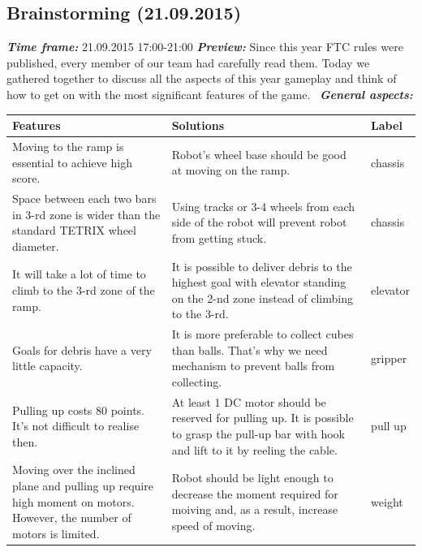 \subsection{Brainstorming (21.09.2015)}
	\textit{\textbf{Time frame:}} 21.09.2015 17:00-21:00 \newline
	\textit{\textbf{Preview:}} Since this year FTC rules were published, every member of our team had carefully read them. Today we gathered together to discuss all the aspects of this year gameplay and think of how to get on with the most significant features of the game. \newline \newline
	\textit{\textbf{General aspects:}}
	\begin{table}[H]
		\vspace{-2mm}
		\begin{center}
			\begin{tabular}{|p{0.4\linewidth}|p{0.5\linewidth}|p{0.1\linewidth}|}
				\hline
				Features & Solutions & Label \\
				\hline
				Moving to the ramp is essential to achieve high score. & Robot's wheel base should be good at moving on the ramp. & chassis \\
				\hline
				Space between each two bars in 3-rd zone is wider than the standard TETRIX wheel diameter. & Using tracks or 3-4 wheels from each side of the robot will prevent robot from getting stuck. & chassis \\
				\hline
				It will take a lot of time to climb to the 3-rd zone of the ramp. & It is possible to deliver debris to the highest goal with elevator standing on the 2-nd zone instead of climbing to the 3-rd. & elevator \\
				\hline
				Goals for debris have a very little capacity. & It is more preferable to collect cubes than balls. That's why we need mechanism to prevent balls from collecting. & gripper \\
				\hline
				Pulling up costs 80 points. It's not difficult to realise then. & At least 1 DC motor should be reserved for pulling up. It is possible to grasp the pull-up bar with hook and lift to it by reeling the cable. & pull up \\
				\hline
				Moving over the inclined plane and pulling up require high moment on motors. However, the number of motors is limited. & Robot should be light enough to decrease the moment required for moiving and, as a result, increase speed of moving. & weight \\
				\hline

\end{tabular}
\end{center}
\end{table}
